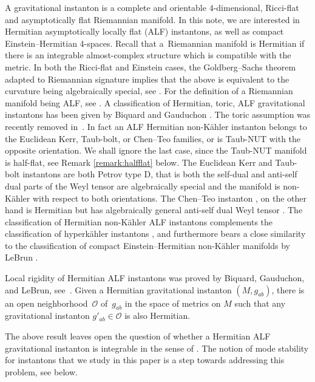 \documentclass[pdftex]{sigma}
\numberwithin{equation}{section}
\begin{document}
A gravitational instanton is a complete and orientable $4$-dimensional, Ricci-flat and asymptotically flat Riemannian manifold. In this note, we are interested in Hermitian asymptotically locally flat (ALF) instantons,
as well as compact Einstein--Hermitian 4-spaces. Recall that a~Riemannian manifold is Hermitian if there is an integrable almost-complex structure which is compatible with the metric. In both the Ricci-flat and Einstein cases, the Goldberg--Sachs theorem adapted to Riemannian signature implies that the above is equivalent to the curvature being algebraically special, see \cite{MR707181, flaherty1976hermitian}.
For the definition of a Riemannian manifold being ALF, see \cite[Definition 1.1]{Biquard:Gauduchon}.
A classification of Hermitian, toric, ALF gravitational instantons has been given by Biquard and Gauduchon \cite{Biquard:Gauduchon}. The toric assumption was recently removed in~\cite{li2023classification}.
In fact an ALF Hermitian non-K\"ahler instanton belongs to the Euclidean Kerr, Taub-bolt, or Chen--Teo families, or is Taub-NUT with the opposite orientation. We shall ignore the last case, since the Taub-NUT manifold is half-flat, see Remark \ref{remark:halfflat} below.
The Euclidean Kerr and Taub-bolt instantons are both Petrov type D, that is both the self-dual and anti-self dual parts of the Weyl tensor are algebraically special and the manifold is non-K\"ahler with respect to both orientations.
The Chen--Teo instanton \cite{2011PhLB..703..359C}, on the other hand is Hermitian but has algebraically general anti-self dual Weyl tensor \cite{aksteiner2021gravitational}. The classification of Hermitian non-K\"ahler ALF instantons complements the classification of hyperk\"ahler instantons \cite{10.4310/ACTA.2021.v227.n2.a2, chen2019gravitational, chen2021gravitational,Kronheimer:1989pu, Minerbe+2011+47+58, 2021arXiv210812991S}, and furthermore bears a close similarity to the classification of compact Einstein--Hermitian non-K\"ahler manifolds by LeBrun \cite{MR2899877}.

Local rigidity of Hermitian ALF instantons was proved by Biquard, Gauduchon, and LeBrun, see~\cite{biquard2023gravitational}. Given a Hermitian gravitational instanton $(M, g_{ab})$, there is an open neighborhood~$\mathcal{O}$ of~$g_{ab}$ in the space of metrics on $M$ such that any gravitational instanton $g'_{ab} \in \mathcal{O}$ is also Hermitian.

\begin{Remark}%
The above result
leaves open the question of whether a Hermitian ALF gravitational instanton is integrable
in the sense of \cite[Section 12.E]{MR2371700}.
The notion of mode stability for instantons that we study in this paper is a step towards addressing this problem, see below.
\end{Remark}
\end{document}
